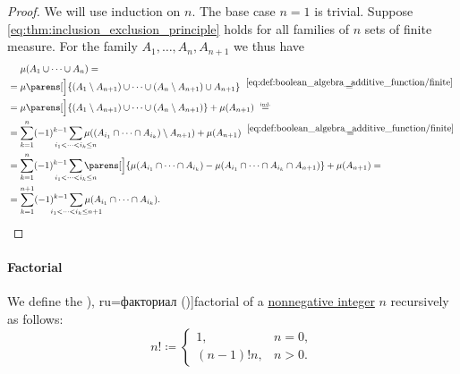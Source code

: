 \begin{proof}
  We will use induction on \( n \). The base case \( n = 1 \) is trivial. Suppose \eqref{eq:thm:inclusion_exclusion_principle} holds for all families of \( n \) sets of finite measure. For the family \( A_1, \ldots, A_n, A_{n+1} \) we thus have
  \begin{align*}
    &\phantom{{}={}}
    \mu(A_1 \cup \cdots \cup A_n)
    = \\ &=
    \mu\parens[\Big]{ (A_1 \setminus A_{n+1}) \cup \cdots \cup (A_n \setminus A_{n+1}) \cup A_{n+1} }
    \reloset {\eqref{eq:def:boolean_algebra_additive_function/finite}} = \\ &=
    \mu\parens[\Big]{ (A_1 \setminus A_{n+1}) \cup \cdots \cup (A_n \setminus A_{n+1}) } + \mu(A_{n+1})
    \reloset {\T{ind.}} = \\ &=
    \sum_{k=1}^n (-1)^{k - 1} \sum_{\mathclap{i_1 < \cdots < i_k \leq n}} \mu( (A_{i_1} \cap \cdots \cap A_{i_k}) \setminus A_{n+1}) + \mu(A_{n+1})
    \reloset {\eqref{eq:def:boolean_algebra_additive_function/finite}} = \\ &=
    \sum_{k=1}^n (-1)^{k - 1} \sum_{\mathclap{i_1 < \cdots < i_k \leq n}} \parens[\Big]{ \mu(A_{i_1} \cap \cdots \cap A_{i_k}) - \mu(A_{i_1} \cap \cdots \cap A_{i_k} \cap A_{n+1}) } + \mu(A_{n+1})
    = \\ &=
    \sum_{k=1}^{n + 1} (-1)^{k - 1} \sum_{\mathclap{i_1 < \cdots < i_k \leq n + 1}} \mu(A_{i_1} \cap \cdots \cap A_{i_k}).
  \end{align*}
\end{proof}

\paragraph{Factorial}

\begin{definition}\label{def:factorial}
  We define the \term[bg=факториел (\cite[129]{Тагамлицки1971Диф}), ru=факториал (\cite[145]{АлександровМаркушевичХинчин1952ЭнциклопедияТом3})]{factorial} of a \hyperref[def:integer_signum]{nonnegative integer} \( n \) recursively as follows:
  \begin{equation*}
    n! \coloneqq \begin{cases}
      1,          &n = 0, \\
      (n - 1)! n, &n > 0.
    \end{cases}
  \end{equation*}
\end{definition}

